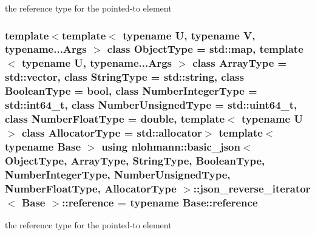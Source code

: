the reference type for the pointed-\/to element 

\hypertarget{classnlohmann_1_1basic__json_1_1json__reverse__iterator_a7265535f39299824f9712a2ca15013c3}{
\subsubsection[{reference}]{\setlength{\rightskip}{0pt plus 5cm}template$<$template$<$ typename U, typename V, typename...\-Args $>$ class Object\-Type = std\-::map, template$<$ typename U, typename...\-Args $>$ class Array\-Type = std\-::vector, class String\-Type  = std\-::string, class Boolean\-Type  = bool, class Number\-Integer\-Type  = std\-::int64\-\_\-t, class Number\-Unsigned\-Type  = std\-::uint64\-\_\-t, class Number\-Float\-Type  = double, template$<$ typename U $>$ class Allocator\-Type = std\-::allocator$>$ template$<$typename Base $>$ using {\bf nlohmann\-::basic\-\_\-json}$<$ Object\-Type, Array\-Type, String\-Type, Boolean\-Type, Number\-Integer\-Type, Number\-Unsigned\-Type, Number\-Float\-Type, Allocator\-Type $>$\-::{\bf json\-\_\-reverse\-\_\-iterator}$<$ Base $>$\-::{\bf reference} =  typename Base\-::reference}}\label{classnlohmann_1_1basic__json_1_1json__reverse__iterator_a7265535f39299824f9712a2ca15013c3}


the reference type for the pointed-\/to element 



